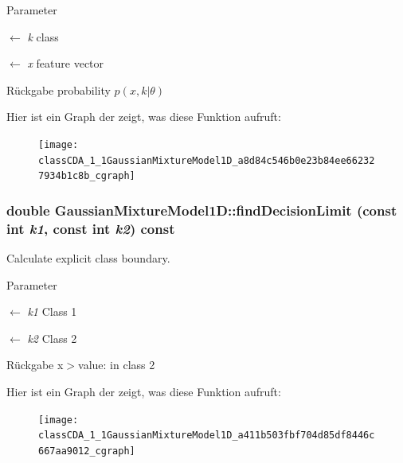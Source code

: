 \begin{DoxyParams}{Parameter}
\item[\mbox{$\leftarrow$} {\em k}]class \item[\mbox{$\leftarrow$} {\em x}]feature vector\end{DoxyParams}
\begin{DoxyReturn}{Rückgabe}
probability $p(x,k\vert\theta)$ 
\end{DoxyReturn}


Hier ist ein Graph der zeigt, was diese Funktion aufruft:\nopagebreak
\begin{figure}[H]
\begin{center}
\leavevmode
\texttt{[image: classCDA\_1\_1GaussianMixtureModel1D\_a8d84c546b0e23b84ee662327934b1c8b\_cgraph]}
\end{center}
\end{figure}


\hypertarget{classCDA_1_1GaussianMixtureModel1D_a411b503fbf704d85df8446c667aa9012}{
\subsubsection[{findDecisionLimit}]{\setlength{\rightskip}{0pt plus 5cm}double GaussianMixtureModel1D::findDecisionLimit (const int {\em k1}, \/  const int {\em k2}) const}}
\label{classCDA_1_1GaussianMixtureModel1D_a411b503fbf704d85df8446c667aa9012}


Calculate explicit class boundary. 


\begin{DoxyParams}{Parameter}
\item[\mbox{$\leftarrow$} {\em k1}]Class 1 \item[\mbox{$\leftarrow$} {\em k2}]Class 2\end{DoxyParams}
\begin{DoxyReturn}{Rückgabe}
x$>$value: in class 2 
\end{DoxyReturn}


Hier ist ein Graph der zeigt, was diese Funktion aufruft:\nopagebreak
\begin{figure}[H]
\begin{center}
\leavevmode
\texttt{[image: classCDA\_1\_1GaussianMixtureModel1D\_a411b503fbf704d85df8446c667aa9012\_cgraph]}
\end{center}
\end{figure}


